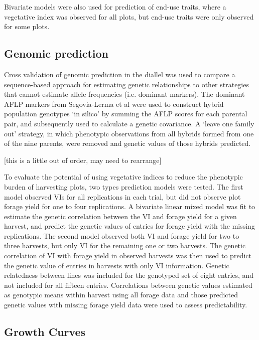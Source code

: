 \documentclass[12pt, letterpaper]{article}
\begin{document}
Bivariate models were also used for prediction of end-use traits, where a vegetative index was observed for all plots, but end-use traits were only observed for some plots.  


\subsection{Genomic prediction}

Cross validation of genomic prediction in the diallel was used to compare a sequence-based approach for estimating genetic relationships to other strategies that cannot estimate allele frequencies (i.e. dominant markers). The dominant AFLP markers from Segovia-Lerma et al \parencite*{segovia2003} were used to construct hybrid population genotypes `in silico' by summing the AFLP scores for each parental pair, and subsequently used to calculate a genetic covariance. A `leave one family out' strategy, in which phenotypic observations from all hybrids formed from one of the nine parents, were removed and genetic values of those hybrids predicted. 


[this is a little out of order, may need to rearrange]

To evaluate the potential of using vegetative indices to reduce the phenotypic burden of harvesting plots, two types prediction models were tested. The first model observed VIs for all replications in each trial, but did not observe plot forage yield for one to four replications. A bivariate linear mixed model was fit to estimate the genetic correlation between the VI and forage yield for a given harvest, and predict the genetic values of entries for forage yield with the missing replications. The second model observed both VI and forage yield for two to three harvests, but only VI for the remaining one or two harvests. The genetic correlation of VI with forage yield in observed harvests was then used to predict the genetic value of entries in harvests with only VI information. Genetic relatedness between lines was included for the genotyped set of eight entries, and not included for all fifteen entries. Correlations between genetic values estimated as genotypic means within harvest using all forage data and those predicted genetic values with missing forage yield data were used to assess predictability.  


\subsection{Growth Curves}
\end{document}
